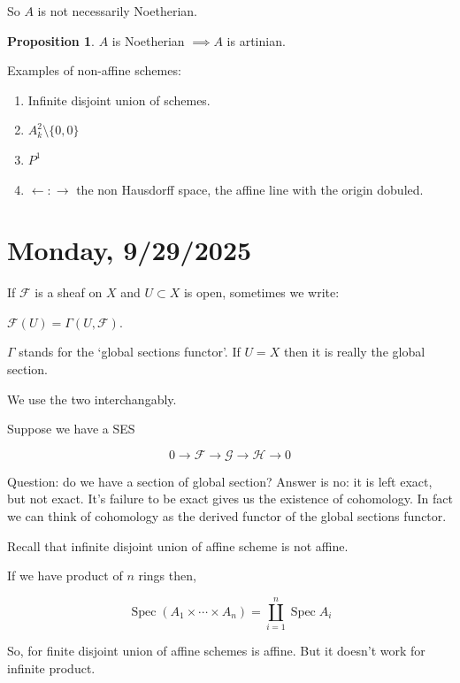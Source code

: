 \documentclass{article}
\theoremstyle{definition}
\newtheorem{proposition}[theorem]{Proposition}
\begin{document}
    So \(A\) is not necessarily Noetherian.

    \begin{proposition}
        \(A\) is Noetherian \(\implies A\) is artinian. 
    \end{proposition}

    Examples of non-affine schemes:

    \begin{enumerate}[label=\arabic*)]
        \item Infinite disjoint union of schemes.
        \item \(A^2_k \setminus \{ 0,0 \} \)
        \item \(P^1\) 
        \item \(\longleftarrow:\longrightarrow\) the non Hausdorff space, the affine line with the origin dobuled. 
    \end{enumerate} 

    \section*{Monday, 9/29/2025}
    
    If \(\mathcal{F}\) is a sheaf on \(X\) and \(U \subset X\) is open,  sometimes we write:

    \(\mathcal{F}(U) = \Gamma(U,\mathcal{F})\).

    \(\Gamma\) stands for the `global sections functor'. If \(U = X\) then it is really the global section.

    We use the two interchangably.

    Suppose we have a SES

    \[
        0 \to \mathcal{F} \to \mathcal{G} \to \mathcal{H} \to 0
    \]

    Question: do we have a section of global section? Answer is no: it is left exact, but not exact. It's failure to be exact gives us the existence of cohomology. In fact we can think of cohomology as the derived functor of the global sections functor.

    Recall that infinite disjoint union of affine scheme is not affine.

    If we have product of \(n\) rings then,
    
    \[
        \operatorname{Spec} (A_1 \times \cdots \times A_n) = \coprod_{i=1}^n \operatorname{Spec} A_i
    \]

    So, for finite disjoint union of affine schemes is affine. But it doesn't work for infinite product.
\end{document}
